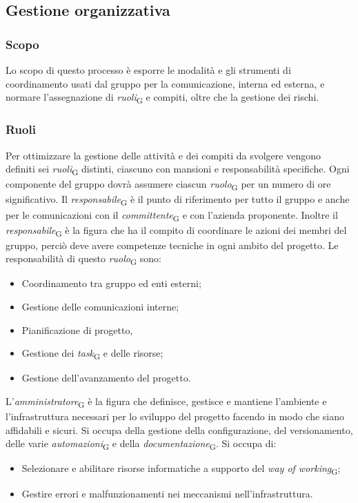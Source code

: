 \subsection{Gestione organizzativa}
\subsubsection{Scopo}
Lo scopo di questo processo è esporre le modalità e gli strumenti di coordinamento usati dal gruppo per la comunicazione, interna ed esterna, e normare l'assegnazione di \textit{ruoli}\textsubscript{G} e compiti, oltre che la gestione dei rischi.

\subsubsection{Ruoli}
Per ottimizzare la gestione delle attività e dei compiti da svolgere vengono definiti sei \textit{ruoli}\textsubscript{G} distinti, ciascuno con mansioni e responsabilità specifiche. Ogni componente del gruppo dovrà assumere ciascun \textit{ruolo}\textsubscript{G} per un numero di ore significativo.
Il \textit{responsabile}\textsubscript{G} è il punto di riferimento per tutto il gruppo e anche per le comunicazioni con il \textit{committente}\textsubscript{G} e con l'azienda proponente.
Inoltre il \textit{responsabile}\textsubscript{G} è la figura che ha il compito di coordinare le azioni dei membri del gruppo, perciò deve avere competenze tecniche in ogni ambito del progetto. Le responsabilità di questo \textit{ruolo}\textsubscript{G} sono:
\begin{itemize}
    \item Coordinamento tra gruppo ed enti esterni;
    \item Gestione delle comunicazioni interne;
    \item Pianificazione di progetto,
    \item Gestione dei \textit{task}\textsubscript{G} e delle risorse;
    \item Gestione dell'avanzamento del progetto.
\end{itemize}
L'\textit{amministratore}\textsubscript{G} è la figura che definisce, gestisce e mantiene l’ambiente e l’infrastruttura necessari per lo sviluppo del progetto facendo in modo che siano affidabili e sicuri. Si occupa della gestione della configurazione, del versionamento, delle varie \textit{automazioni}\textsubscript{G} e della \textit{documentazione}\textsubscript{G}. Si occupa di:
\begin{itemize}
    \item Selezionare e abilitare risorse informatiche a supporto del \textit{way of working}\textsubscript{G};
    \item Gestire errori e malfunzionamenti nei meccanismi nell’infrastruttura.
\end{itemize}

